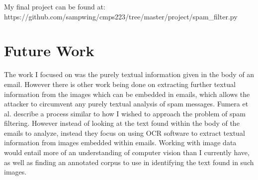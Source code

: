 \documentclass[12pt]{amsart}
\begin{document}
	My final project can be found at: \\ https://github.com/sampwing/cmps223/tree/master/project/spam\_filter.py
\section{Future Work}
	The work I focused on was the purely textual information given in the body of an email.  However there is other work being done on extracting further textual information from the images which can be embedded in emails, which allows the attacker to circumvent any purely textual analysis of spam messages.  Fumera et al. \cite{spamimages} describe a process similar to how I wished to approach the problem of spam filtering.  However instead of looking at the text found within the body of the emails to analyze, instead they focus on using OCR software to extract textual information from images embedded within emails.  Working with image data would entail more of an understanding of computer vision than I currently have, as well as finding an annotated corpus to use in identifying the text found in such images.




\end{document}
